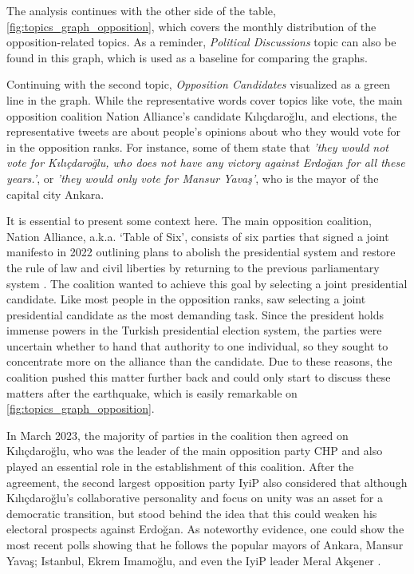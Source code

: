 The analysis continues with the other side of the table, \autoref{fig:topics_graph_opposition}, 
which covers the monthly distribution of the opposition-related topics. As a reminder, 
\textit{Political Discussions} topic can also be found in this graph, which is used as a baseline 
for comparing the graphs.

Continuing with the second topic, \textit{Opposition Candidates} visualized as a green line in the 
graph. While the representative words cover topics like vote, the main opposition coalition 
Nation Alliance's candidate Kılıçdaroğlu, and elections, the representative tweets are about 
people's opinions about who they would vote for in the opposition ranks. For instance, some of 
them state that \textit{'they would not vote for Kılıçdaroğlu, who does not have any victory 
against Erdoğan for all these years.'}, or  \textit{'they would only vote for Mansur Yavaş'}, 
who is the mayor of the capital city Ankara. 

It is essential to present some context here. The main opposition coalition, Nation Alliance, 
a.k.a. `Table of Six', consists of six parties that signed a joint manifesto in 2022 outlining 
plans to abolish the presidential system and restore the rule of law and civil liberties by 
returning to the previous parliamentary system \parencite{berk_esen_opposition_alliance_2023}. 
The coalition wanted to achieve this goal by selecting a joint presidential candidate. 
Like most people in the opposition ranks, \parencite{berk_esen_opposition_alliance_2023} saw 
selecting a joint presidential candidate as the most demanding task. 
Since the president holds immense powers in the Turkish presidential election system, the parties 
were uncertain whether to hand that authority to one individual, so they sought to concentrate 
more on the alliance than the candidate. Due to these reasons, the coalition pushed this matter 
further back and could only start to discuss these matters after the earthquake, which is easily 
remarkable on \autoref{fig:topics_graph_opposition}. 

In March 2023, the majority of parties in the coalition then agreed on Kılıçdaroğlu, 
who was the leader of the main opposition party \ac{CHP} and also played an essential role in 
the establishment of this coalition. 
After the agreement, the second largest opposition party \ac{IyiP} also considered that although 
Kılıçdaroğlu's collaborative personality and focus on unity was an asset for a democratic 
transition, but stood behind the idea that this could weaken his electoral prospects against 
Erdo­ğan. As noteworthy evidence, one could show the most recent polls showing that he 
follows the popular mayors of Ankara, Mansur Yavaş; Istanbul, Ekrem Imamoğlu, and even the 
\ac{IyiP} leader Meral Akşener \parencite{berk_esen_opposition_alliance_2023}.

